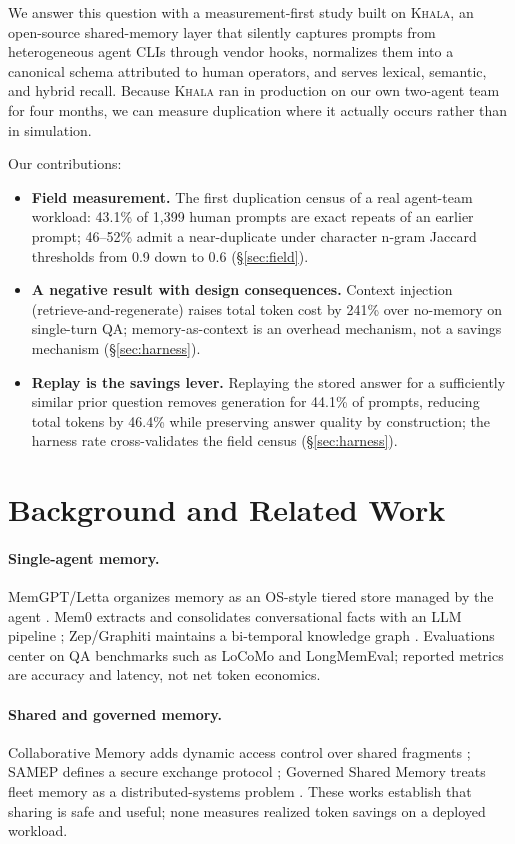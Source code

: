 \documentclass{article}
\newcommand{\khala}{\textsc{Khala}}
\begin{document}
We answer this question with a measurement-first study built on \khala{},
an open-source shared-memory layer that silently captures prompts from
heterogeneous agent CLIs through vendor hooks, normalizes them into a
canonical schema attributed to human operators, and serves lexical,
semantic, and hybrid recall. Because \khala{} ran in production on our own
two-agent team for four months, we can measure duplication where it actually
occurs rather than in simulation.

Our contributions:
\begin{itemize}[leftmargin=*,nosep]
\item \textbf{Field measurement.} The first duplication census of a real
agent-team workload: 43.1\% of 1{,}399 human prompts are exact repeats of an
earlier prompt; 46--52\% admit a near-duplicate under character n-gram
Jaccard thresholds from 0.9 down to 0.6 (\S\ref{sec:field}).
\item \textbf{A negative result with design consequences.} Context injection
(retrieve-and-regenerate) raises total token cost by 241\% over no-memory on
single-turn QA; memory-as-context is an overhead mechanism, not a savings
mechanism (\S\ref{sec:harness}).
\item \textbf{Replay is the savings lever.} Replaying the stored answer for
a sufficiently similar prior question removes generation for 44.1\% of
prompts, reducing total tokens by 46.4\% while preserving answer quality by
construction; the harness rate cross-validates the field census
(\S\ref{sec:harness}).
\end{itemize}

\section{Background and Related Work}
\label{sec:related}
\paragraph{Single-agent memory.} MemGPT/Letta organizes memory as an OS-style
tiered store managed by the agent \citep{packer2023memgpt}. Mem0 extracts and
consolidates conversational facts with an LLM pipeline \citep{chhikara2025mem0};
Zep/Graphiti maintains a bi-temporal knowledge graph \citep{rasmussen2025zep}.
Evaluations center on QA benchmarks such as LoCoMo and LongMemEval; reported
metrics are accuracy and latency, not net token economics.

\paragraph{Shared and governed memory.} Collaborative Memory adds dynamic
access control over shared fragments \citep{kim2025collaborative}; SAMEP
defines a secure exchange protocol \citep{samep2025}; Governed Shared Memory
treats fleet memory as a distributed-systems problem
\citep{governed2026}. These works establish that sharing is safe and useful;
none measures realized token savings on a deployed workload.
\end{document}
